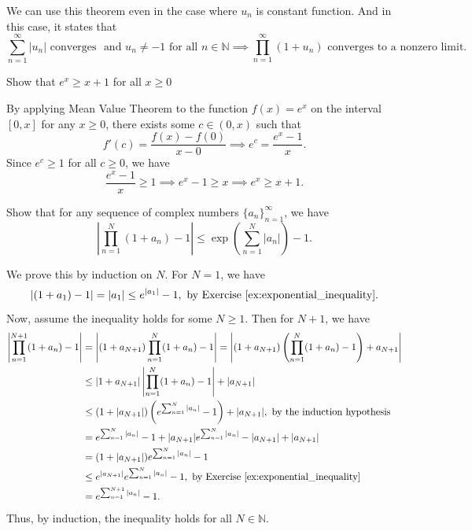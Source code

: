 \documentclass{elegantbook}
\begin{document}
\begin{note}
  We can use this theorem even in the case where $u_n$ is constant function. And in this case, it states that
  \[
    \sum_{n=1}^{\infty} |u_n| \text{ converges } \text{ and } u_n \ne -1 \text{ for all } n \in \mathbb{N} \implies \prod_{n=1}^{\infty} (1 + u_n) \text{ converges to a nonzero limit. }
  \]
\end{note}

\begin{exercise} \label{ex:exponential_inequality}
  Show that $e^x \geq x+1$ for all $x\geq0$
\end{exercise}

\begin{solution}
  By applying Mean Value Theorem to the function $f(x) = e^x$ on the interval $[0, x]$ for any $x \geq 0$, there exists some $c \in (0, x)$ such that
  \[
    f'(c) = \frac{f(x) - f(0)}{x - 0} \implies e^c = \frac{e^x - 1}{x}.
  \]
  Since $e^c \geq 1$ for all $c \geq 0$, we have
  \[
    \frac{e^x - 1}{x} \geq 1 \implies e^x - 1 \geq x \implies e^x \ge x + 1.
  \]
\end{solution}

\begin{exercise} \label{ex:product_inequality_based_on_exponential}
  Show that for any sequence of complex numbers $\{a_n\}_{n=1}^{\infty}$, we have
  \[
    \left|\prod_{n=1}^{N} (1 + a_n) - 1\right| \leq \exp\left(\sum_{n=1}^{N} |a_n|\right) - 1.
  \]
\end{exercise}

\begin{solution}
  We prove this by induction on $N$. For $N=1$, we have
  \[
    \left| (1 + a_1) - 1 \right| = |a_1| \leq e^{|a_1|} - 1, \text{ by Exercise~\ref{ex:exponential_inequality}.}
  \]
  Now, assume the inequality holds for some $N \geq 1$. Then for $N+1$, we have
  \begin{align*}
    \left|\prod_{n=1}^{N+1} (1 + a_n) - 1\right| &= \left| (1 + a_{N+1}) \prod_{n=1}^{N} (1 + a_n) - 1 \right| = \left| (1 + a_{N+1}) \left(\prod_{n=1}^{N} (1 + a_n) - 1\right) + a_{N+1} \right| \\
    &\leq |1 + a_{N+1}| \left|\prod_{n=1}^{N} (1 + a_n) - 1\right| + |a_{N+1}| \\
    &\leq (1 + |a_{N+1}|) \left( e^{\sum_{n=1}^{N} |a_n|} - 1 \right) + |a_{N+1}|, \text{ by the induction hypothesis } \\
    &= e^{\sum_{n=1}^{N} |a_n|} - 1 + |a_{N+1}| e^{\sum_{n=1}^{N} |a_n|} - |a_{N+1}| + |a_{N+1}| \\
    &= (1+ |a_{N+1}|) e^{\sum_{n=1}^{N} |a_n|} - 1 \\
    &\leq e^{|a_{N+1}|} e^{\sum_{n=1}^{N} |a_n|} - 1, \text{ by Exercise~\ref{ex:exponential_inequality} } \\
    &= e^{\sum_{n=1}^{N+1} |a_n|} - 1.
  \end{align*}
  Thus, by induction, the inequality holds for all $N \in \mathbb{N}$.
\end{solution}
\end{document}

